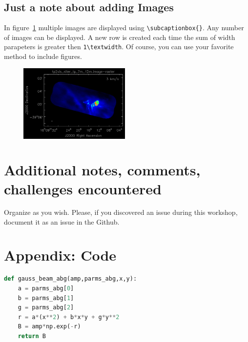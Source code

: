 \documentclass[12pt,a4paper]{article}
\begin{document}

\subsection{Just a note about adding Images}

In figure~\ref{fig:example} multiple images are displayed using \texttt{\textbackslash subcaptionbox\{\}}. Any number of images can be displayed. A new row is created each time the sum of width parapeters is greater then \texttt{1\textbackslash textwidth}.  Of course, you can use your favorite method to include figures.

\begin{figure}[!htb]
\centering
{\includegraphics[width=0.49\textwidth]{images/tp2vis_3kms.png}}
\hfill
\caption{\label{fig:example}}
\end{figure}

\section{Additional notes, comments, challenges encountered}

Organize as you wish.  Please, if you discovered an issue during this workshop, document it as an issue in the Github.  

\clearpage
\section{Appendix: Code}

\begin{lstlisting}[language=Python]
def gauss_beam_abg(amp,parms_abg,x,y):
    a = parms_abg[0]
    b = parms_abg[1]
    g = parms_abg[2]
    r = a*(x**2) + b*x*y + g*y**2
    B = amp*np.exp(-r)
    return B
\end{lstlisting}
\end{document}
